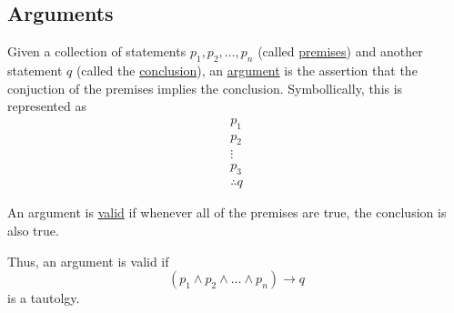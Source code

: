 \subsection{Arguments}
\begin{definition}
    Given a collection of statements $p_1,p_2,\dots,p_n$ (called \underline{premises}) and another statement $q$ (called the \underline{conclusion}), an \underline{argument} is the assertion that the conjuction of the premises implies the conclusion. Symbollically, this is represented as \begin{align*}p_1 \\ p_2 \\ \vdots \\ p_3 \\ \therefore q\end{align*}
\end{definition}

\begin{definition}
    An argument is \underline{valid} if whenever all of the premises are true, the conclusion is also true.

    Thus, an argument is valid if $$\left(p_1\land p_2 \land \dots \land p_n\right)\rightarrow q$$ is a tautolgy.
\end{definition}

